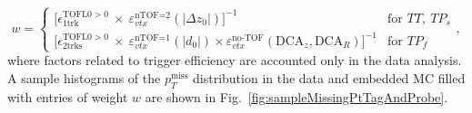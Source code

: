 \begin{equation}\label{eq:tagAndProbeWeight}%
w=\left\{
\begin{array}{ll}
\Big[\epsilon^{\text{TOFL0}>0}_{1\text{trk}}~\times~\varepsilon_{vtx}^{\text{nTOF=2}}(|\Delta z_{0}|)\Big]^{-1} & \textrm{for~}TT,~TP_{s}\\[3pt]
\Big[\epsilon^{\text{TOFL0}>0}_{2\text{trks}}~\times~\varepsilon_{vtx}^{\text{nTOF=1}}(|d_{0}|)\times \varepsilon_{vtx}^{\text{no-TOF}}(\text{DCA}_{z},\text{DCA}_{R})\Big]^{-1} & \textrm{for~}TP_{f}
\end{array}
\right.,
\end{equation}
where factors related to trigger efficiency are accounted only in the data analysis. A sample histograms of the $p_{T}^{\text{miss}}$ distribution in the data and embedded MC filled with entries of weight $w$ are shown in Fig.~\ref{fig:sampleMissingPtTagAndProbe}.






